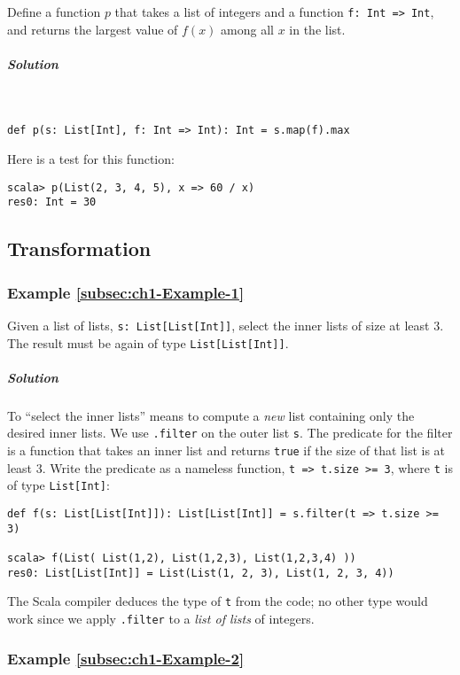 Define a function $p$ that takes a list of integers and a function
\lstinline!f: Int => Int!, and returns the largest value of $f(x)$
among all $x$ in the list.

\subparagraph{Solution}

~

\begin{lstlisting}
def p(s: List[Int], f: Int => Int): Int = s.map(f).max
\end{lstlisting}
Here is a test for this function:
\begin{lstlisting}
scala> p(List(2, 3, 4, 5), x => 60 / x)
res0: Int = 30
\end{lstlisting}


\subsection{Transformation}

\subsubsection{Example \label{subsec:ch1-Example-1}\ref{subsec:ch1-Example-1}}

Given a list of lists, \lstinline!s: List[List[Int]]!, select the
inner lists of size at least $3$. The result must be again of type
\lstinline!List[List[Int]]!. 

\subparagraph{Solution}

To ``select the inner lists'' means to compute a \emph{new} list
containing only the desired inner lists. We use \texttt{}\lstinline!.filter!
on the outer list \lstinline!s!. The predicate for the filter is
a function that takes an inner list and returns \texttt{}\lstinline!true!
if the size of that list is at least $3$. Write the predicate as
a nameless function, \lstinline!t => t.size >= 3!, where \texttt{}\lstinline!t!
is of type \lstinline!List[Int]!:
\begin{lstlisting}
def f(s: List[List[Int]]): List[List[Int]] = s.filter(t => t.size >= 3)

scala> f(List( List(1,2), List(1,2,3), List(1,2,3,4) ))
res0: List[List[Int]] = List(List(1, 2, 3), List(1, 2, 3, 4)) 
\end{lstlisting}
The Scala compiler deduces the type of \lstinline!t! from the code;
no other type would work since we apply \lstinline!.filter! to a
\emph{list of lists} of integers.

\subsubsection{Example \label{subsec:ch1-Example-2}\ref{subsec:ch1-Example-2}}


